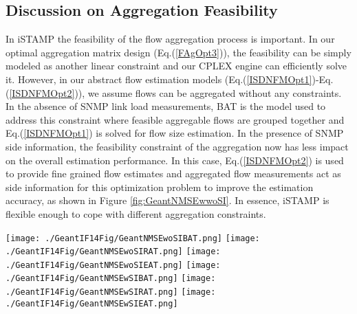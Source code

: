 \subsection{Discussion on Aggregation Feasibility} \label{sec:AggFsb}
In iSTAMP the feasibility of the flow aggregation process is important. In our optimal aggregation matrix design (Eq.(\ref{FAgOpt3})), the feasibility can be simply modeled as another linear constraint and our CPLEX engine can efficiently solve it. However, in our abstract flow estimation models (Eq.(\ref{ISDNFMOpt1})-Eq.(\ref{ISDNFMOpt2})), we assume flows can be aggregated without any constraints. In the absence of SNMP link load measurements, BAT is the model used to address this constraint where feasible aggregable flows are grouped together and Eq.(\ref{ISDNFMOpt1}) is solved for flow size estimation. In the presence of SNMP side information, the feasibility constraint of the aggregation now has less impact on the overall estimation performance. In this case, Eq.(\ref{ISDNFMOpt2}) is used to provide fine grained flow estimates and aggregated flow measurements act as side information for this optimization problem to improve the estimation accuracy, as shown in Figure \ref{fig:GeantNMSEwwoSI}. In essence, iSTAMP is flexible enough to cope with different aggregation constraints.

\begin{figure*}
  \begin{center}
    {\texttt{[image: ./GeantIF14Fig/GeantNMSEwoSIBAT.png]}} \hfill  %
    {\texttt{[image: ./GeantIF14Fig/GeantNMSEwoSIRAT.png]}} \hfill
    {\texttt{[image: ./GeantIF14Fig/GeantNMSEwoSIEAT.png]}} \hfill
    {\texttt{[image: ./GeantIF14Fig/GeantNMSEwSIBAT.png]}} \hfill
    {\texttt{[image: ./GeantIF14Fig/GeantNMSEwSIRAT.png]}} \hfill
    {\texttt{[image: ./GeantIF14Fig/GeantNMSEwSIEAT.png]}}
  \end{center}
  \caption{{\footnotesize{$NMSE$ for Geant Network with different configurations using Eq.(\ref{ISDNFMOpt1})-Eq.(\ref{ISDNFMOpt2}) with ($p,q,\lambda$)=(2,1,0.01) $\rho=1$ and $\delta=1.975$.}}}
  \label{fig:GeantNMSEwwoSI}
\end{figure*}

